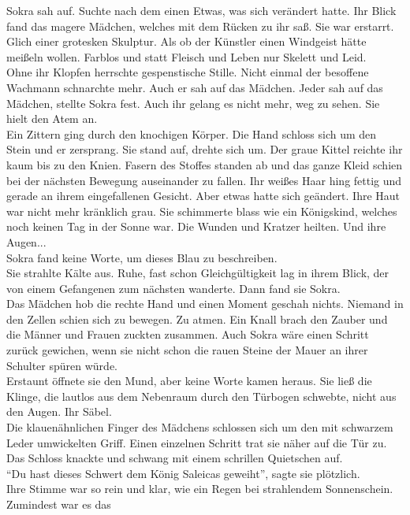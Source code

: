 Sokra sah auf. Suchte nach dem einen Etwas, was sich verändert hatte. Ihr Blick fand das magere 
Mädchen, welches mit dem Rücken zu ihr saß. Sie war erstarrt. Glich einer grotesken Skulptur. Als ob 
der Künstler einen Windgeist hätte meißeln wollen. Farblos und statt Fleisch und Leben nur Skelett 
und Leid.\\
Ohne ihr Klopfen herrschte gespenstische Stille. Nicht einmal der besoffene Wachmann schnarchte 
mehr. Auch er sah auf das Mädchen. Jeder sah auf das Mädchen, stellte Sokra fest. Auch ihr gelang 
es nicht mehr, weg zu sehen. Sie hielt den Atem an.\\
Ein Zittern ging durch den knochigen Körper. Die Hand schloss sich um den Stein und er zersprang. 
Sie stand auf, drehte sich um. Der graue Kittel reichte ihr kaum bis zu den Knien. Fasern des 
Stoffes standen ab und das ganze Kleid schien bei der nächsten Bewegung auseinander zu fallen. Ihr 
weißes Haar hing fettig und gerade an ihrem eingefallenen Gesicht. Aber etwas hatte sich geändert. 
Ihre Haut war nicht mehr kränklich grau. Sie schimmerte blass wie ein Königskind, welches noch 
keinen Tag in der Sonne war. Die Wunden und Kratzer heilten. Und ihre Augen...\\
Sokra fand keine Worte, um dieses Blau zu beschreiben.\\
Sie strahlte Kälte aus. Ruhe, fast schon Gleichgültigkeit lag in ihrem Blick, der von einem 
Gefangenen zum nächsten wanderte. Dann fand sie Sokra.\\
Das Mädchen hob die rechte Hand und einen Moment geschah nichts. Niemand in den Zellen schien sich 
zu bewegen. Zu atmen. Ein Knall brach den Zauber und die Männer und Frauen zuckten zusammen. Auch 
Sokra wäre einen Schritt zurück gewichen, wenn sie nicht schon die rauen Steine der Mauer an ihrer 
Schulter spüren würde.\\
Erstaunt öffnete sie den Mund, aber keine Worte kamen heraus. Sie ließ die Klinge, die lautlos aus 
dem Nebenraum durch den Türbogen schwebte, nicht aus den Augen. Ihr Säbel.\\
Die klauenähnlichen Finger des Mädchens schlossen sich um den mit schwarzem Leder umwickelten 
Griff. Einen einzelnen Schritt trat sie näher auf die Tür zu. Das Schloss knackte und schwang mit 
einem schrillen Quietschen auf.\\
``Du hast dieses Schwert dem König Saleicas geweiht'', sagte sie plötzlich.\\
Ihre Stimme war so rein und klar, wie ein Regen bei strahlendem Sonnenschein. Zumindest war es das 

